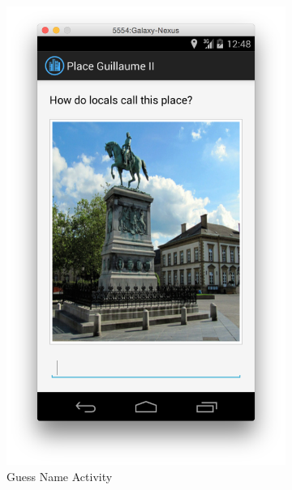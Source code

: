 \begin{figure}[H]
\begin{subfigure}[b]{0.3\textwidth}
                \includegraphics[width=\textwidth]{Figures/GuessNameActivity}
                \caption{Guess Name Activity}
        \end{subfigure}%
	\begin{subfigure}[b]{0.3\textwidth}

\end{subfigure}
\end{figure}
